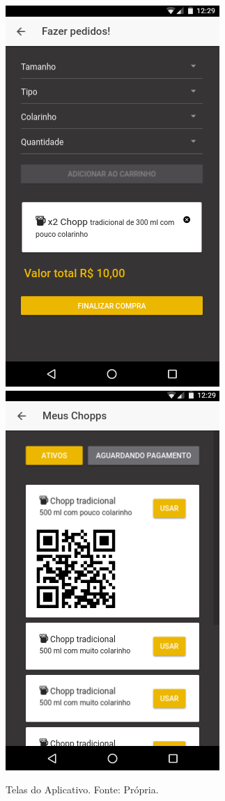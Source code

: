 \begin{figure}[!htb]
    \includegraphics[scale= 0.3]{figuras/Aplicativo/compra.png}   
    \includegraphics[scale= 0.3]{figuras/Aplicativo/chopps.png}   
    \caption{Telas do Aplicativo. Fonte: Própria.}
    \label{home-page}
\end{figure}

